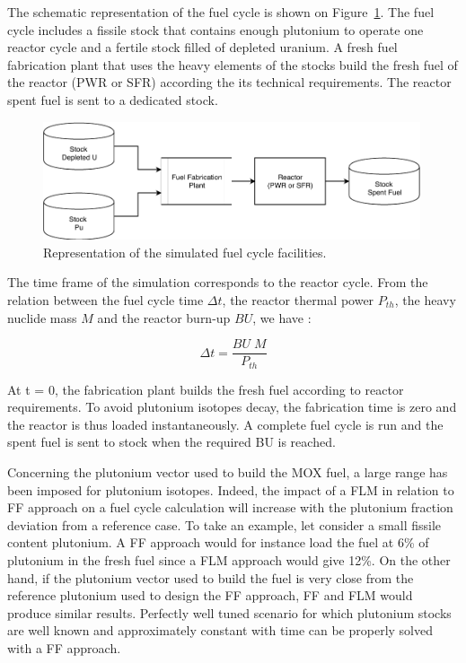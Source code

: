 The schematic representation of the fuel cycle is shown on
Figure~\ref{fig:FuelCycle}. The fuel cycle includes a fissile stock that
contains enough plutonium to operate one reactor cycle and a fertile stock
filled of depleted uranium. A fresh fuel fabrication plant that uses the heavy
elements of the stocks build the fresh fuel of the reactor (PWR or SFR)
according the its technical requirements. The reactor spent fuel is sent to a
dedicated stock.

\begin{figure}[h]
    \begin{center}
        \includegraphics[width = 0.99\textwidth]{FIG/FuelCycleDiagram.pdf}
        \caption{Representation of the simulated fuel cycle facilities.}
        \label{fig:FuelCycle}
    \end{center}
\end{figure}

The time frame of the simulation corresponds to the reactor cycle. From the
relation between the fuel cycle time $\Delta t$, the reactor thermal power
$P_{th}$, the heavy nuclide mass $M$ and the reactor burn-up $BU$, we have : 

\begin{equation}
    \Delta t = \frac{BU \; M}{P_{th}}
\end{equation}

At t = 0, the fabrication plant builds the fresh fuel according to reactor
requirements. To avoid plutonium isotopes decay, the fabrication time is zero
and the reactor is thus loaded instantaneously. A complete fuel cycle is run and
the spent fuel is sent to stock when the required BU is reached.

Concerning the plutonium vector used to build the MOX fuel, a large range has
been imposed for plutonium isotopes. Indeed, the impact of a \gls{FLM} in
relation to \gls{FF} approach on a fuel cycle calculation will increase with the
plutonium fraction deviation from a reference case. To take an example, let
consider a small fissile content plutonium. A \gls{FF} approach would for
instance load the fuel at 6\% of plutonium in the fresh fuel since a \gls{FLM}
approach would give 12\%. On the other hand, if the plutonium vector used to
build the fuel is very close from the reference plutonium used to design the
\gls{FF} approach, \gls{FF} and \gls{FLM} would produce similar results.
Perfectly well tuned scenario for which plutonium stocks are well known and
approximately constant with time can be properly solved with a \gls{FF}
approach. 

